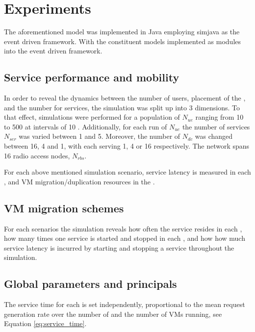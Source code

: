 \section{Experiments}
The aforementioned model was implemented in Java employing simjava \cite{SimJava} as the event driven framework. With the constituent models implemented as modules into the event driven framework.

\subsection{Service performance and mobility}
In order to reveal the dynamics between the number of users, placement of the \dcs{}, and the number for services, the simulation was split up into 3 dimensions.
To that effect, simulations were performed for a population of \ues{} $N_{ue}$ ranging from 10 to 500 \ues{} at intervals of 10 \ues{}.
Additionally, for each run of $N_{ue}$ the number of services $N_{ser}$ was varied between 1 and 5.
Moreover, the number of \dcs{} $N_{dc}$ was changed between 16, 4 and 1, with each \dc{} serving 1, 4 or 16 \rbss{} respectively.
The network spans 16 radio access nodes, $N_{rbs}$.

For each above mentioned simulation scenario, service latency is measured in each \ue{}, and VM migration/duplication resources in the \dc{}.

\subsection{VM migration schemes}
For each scenarios the simulation reveals how often the service resides in each \dc{}, how many times one service is started and stopped in each \dc{}, and how how much service latency is incurred by starting and stopping a service throughout the simulation.

\subsection{Global parameters and principals}
The service time for each \dc{} is set independently, proportional to the mean request generation rate over the number of \rbss{} and the number of VMs running, see Equation \ref{eq:service_time}.

